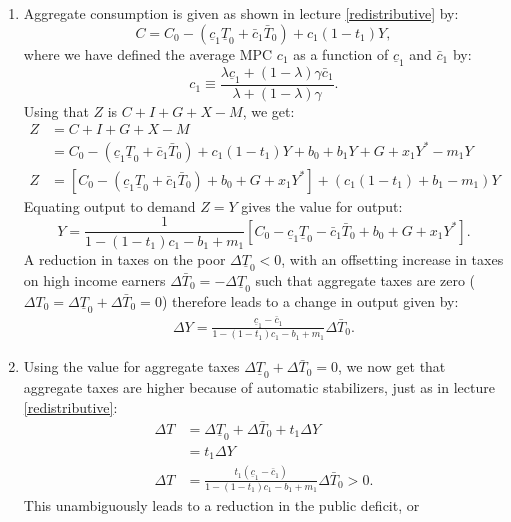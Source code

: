 \documentclass[]{book}
\begin{document}
\begin{enumerate}
\def\labelenumi{\arabic{enumi}.}
\item
  Aggregate consumption is given as shown in lecture
  \ref{redistributive} by:
  \[C=C_0 -\left(\underline{c}_{1}\underline{T}_0+\bar{c}_{1}\bar{T}_0\right)+c_1 (1-t_1) Y,\]
  where we have defined the average MPC \(c_1\) as a function of
  \(\underline{c}_1\) and \(\bar{c}_1\) by:
  \[c_{1} \equiv \frac{\lambda\underline{c}_{1}+\left(1-\lambda\right)\gamma\bar{c}_{1}}{\lambda+(1-\lambda)\gamma}.\]
  Using that \(Z\) is \(C+I+G+X-M\), we get: \[
  \begin{aligned}
  Z   &=C+I+G+X-M\\
  &=C_0 -\left(\underline{c}_{1}\underline{T}_0+\bar{c}_{1}\bar{T}_0\right)+c_1 (1-t_1) Y + b_{0}+b_{1}Y+G + x_1 Y^{*} - m_1 Y\\
  Z   &=\left[C_0 -\left(\underline{c}_{1}\underline{T}_0+\bar{c}_{1}\bar{T}_0\right)+ b_{0} + G + x_1 Y^{*} \right]+ \left(c_1(1-t_1) + b_1-m_1\right) Y 
  \end{aligned}
  \] Equating output to demand \(Z = Y\) gives the value for output:
  \[Y=\frac{1}{1-\left(1-t_{1}\right)c_{1}-b_{1}+m_1}\left[C_0-\underline{c}_{1}\underline{T}_{0}-\bar{c}_{1}\bar{T}_{0}+b_{0}+G + x_1 Y^{*}\right].\]
  A reduction in taxes on the poor \(\Delta\underline{T}_{0}<0\), with
  an offsetting increase in taxes on high income earners
  \(\Delta \bar{T}_0 = -\Delta\underline{T}_{0}\) such that aggregate
  taxes are zero
  (\(\Delta T_0=\Delta\underline{T}_{0}+\Delta\bar{T}_{0}=0\)) therefore
  leads to a change in output given by: \[
  \begin{aligned}
  \boxed{\Delta Y=\frac{\underline{c}_{1}-\bar{c}_{1}}{1-\left(1-t_{1}\right)c_{1}-b_{1}+m_1}\Delta\bar{T}_{0}}.
  \end{aligned}
  \]
\item
  Using the value for aggregate taxes
  \(\Delta\underline{T}_{0}+\Delta\bar{T}_{0}=0\), we now get that
  aggregate taxes are higher because of automatic stabilizers, just as
  in lecture \ref{redistributive}: \[
  \begin{aligned}
  \Delta T&=\Delta\underline{T}_{0}+\Delta\bar{T}_{0}+t_1\Delta Y\\
  &=t_1 \Delta Y\\
  \Delta T&=\frac{t_1\left(\underline{c}_{1}-\bar{c}_{1}\right)}{1-\left(1-t_{1}\right)c_{1}-b_{1}+m_1}\Delta\bar{T}_{0}>0.
  \end{aligned}
  \] This unambiguously leads to a reduction in the public deficit, or

\end{enumerate}
\end{document}
